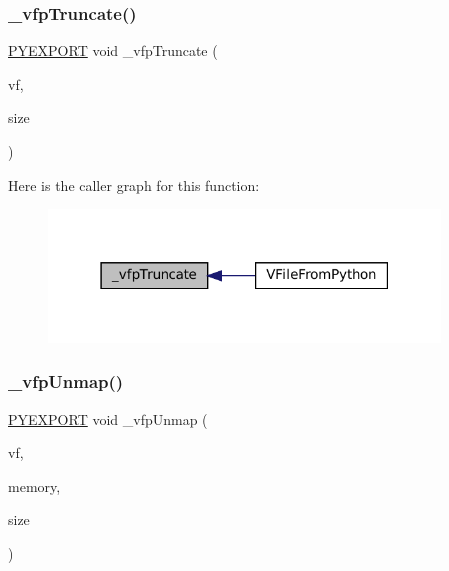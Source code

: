 \subsubsection{\texorpdfstring{\+\_\+vfp\+Truncate()}{\_vfpTruncate()}}
{\footnotesize\ttfamily \mbox{\hyperlink{pycommon_8h_a68eebefd6b08dcf3f0bc2b2fe43a32b6}{P\+Y\+E\+X\+P\+O\+RT}} void \+\_\+vfp\+Truncate (\begin{DoxyParamCaption}\item[{struct V\+File $\ast$}]{vf,  }\item[{size\+\_\+t}]{size }\end{DoxyParamCaption})}

Here is the caller graph for this function\+:
\nopagebreak
\begin{figure}[H]
\begin{center}
\leavevmode
\includegraphics[width=295pt]{vfs-py_8h_a5ac15c49208623a9cc85c268badc6347_icgraph}
\end{center}
\end{figure}
\mbox{\label{vfs-py_8h_a8e07b0e17503c8a4d583587cdf5864f5}} 
\subsubsection{\texorpdfstring{\+\_\+vfp\+Unmap()}{\_vfpUnmap()}}
{\footnotesize\ttfamily \mbox{\hyperlink{pycommon_8h_a68eebefd6b08dcf3f0bc2b2fe43a32b6}{P\+Y\+E\+X\+P\+O\+RT}} void \+\_\+vfp\+Unmap (\begin{DoxyParamCaption}\item[{struct V\+File $\ast$}]{vf,  }\item[{void $\ast$}]{memory,  }\item[{size\+\_\+t}]{size }\end{DoxyParamCaption})}

